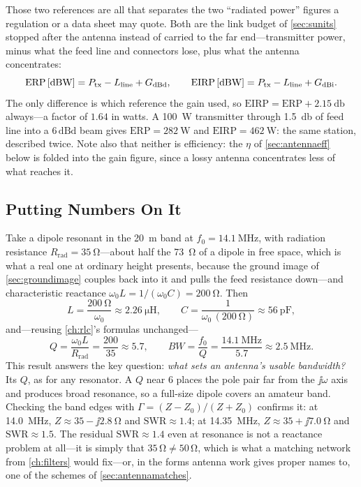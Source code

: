 Those two references are all that separates the two ``radiated power'' figures a
regulation or a data sheet may quote. Both are the link budget of \cref{sec:sunits}
stopped after the antenna instead of carried to the far end---transmitter power, minus
what the feed line and connectors lose, plus what the antenna concentrates:
\[
\mathrm{ERP}\,[\mathrm{dB}\mathrm{W}]=P_{\text{tx}}-L_{\text{line}}+G_{\mathrm{dBd}},
\qquad
\mathrm{EIRP}\,[\mathrm{dB}\mathrm{W}]=P_{\text{tx}}-L_{\text{line}}+G_{\mathrm{dBi}} .
\]
The only difference is which reference the gain used, so
\(\mathrm{EIRP}=\mathrm{ERP}+\SI{2.15}{\decibel}\) always---a factor of \(1.64\) in
watts. A \SI{100}{\watt} transmitter through \SI{1.5}{\decibel} of feed line into a
\(6\,\mathrm{dBd}\) beam gives
\(\mathrm{ERP}=\SI{282}{\watt}\) and \(\mathrm{EIRP}=\SI{462}{\watt}\): the same
station, described twice. Note also that neither is efficiency: the \(\eta\) of
\cref{sec:antennaeff} below is folded into the gain figure, since a lossy antenna
concentrates less of what reaches it.

\subsection{Putting Numbers On It}
Take a dipole resonant in the \SI{20}{\meter} band at
\(f_0=\SI{14.1}{\mega\hertz}\), with radiation resistance
\(R_{\text{rad}}=\SI{35}{\ohm}\)---about half the \SI{73}{\ohm} of a dipole in
free space, which is what a real one at ordinary height presents, because the ground
image of \cref{sec:groundimage} couples back into it and pulls the feed resistance
down---and characteristic reactance
\(\omega_0L=1/(\omega_0C)=\SI{200}{\ohm}\). Then
\[
L=\frac{\SI{200}{\ohm}}{\omega_0}\approx\SI{2.26}{\micro\henry},
\qquad
C=\frac{1}{\omega_0\,(\SI{200}{\ohm})}\approx\SI{56}{\pico\farad},
\]
and---reusing \cref{ch:rlc}'s formulas unchanged---
\[
Q=\frac{\omega_0L}{R_{\text{rad}}}=\frac{200}{35}\approx5.7,
\qquad
BW=\frac{f_0}{Q}=\frac{\SI{14.1}{\mega\hertz}}{5.7}\approx\SI{2.5}{\mega\hertz}.
\]
This result answers the key question: \emph{what sets an antenna's usable
bandwidth?} Its \(Q\), as for any resonator. A \(Q\) near \(6\) places the pole pair
far from the \(\jj\omega\) axis and produces broad resonance, so a full-size dipole
covers an amateur band.
Checking the band edges with \(\Gamma=(Z-Z_0)/(Z+Z_0)\) confirms it: at
\SI{14.0}{\mega\hertz}, \(Z\approx35-\jj2.8\ \si{\ohm}\) and
\(\mathrm{SWR}\approx1.4\); at \SI{14.35}{\mega\hertz},
\(Z\approx35+\jj7.0\ \si{\ohm}\) and \(\mathrm{SWR}\approx1.5\). The residual
\(\mathrm{SWR}\approx1.4\) even at resonance is not a reactance problem at all---it is
simply that \(35\,\si{\ohm}\ne50\,\si{\ohm}\), which is what a matching network from
\cref{ch:filters} would fix---or, in the forms antenna work gives proper names to,
one of the schemes of \cref{sec:antennamatches}.

